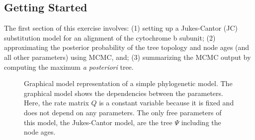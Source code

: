 \bigskip
\subsection{Getting Started}

The first section of this exercise involves:
(1) setting up a Jukes-Cantor (JC) substitution model for an alignment of the cytochrome b subunit;
(2) approximating the posterior probability of the tree topology and node ages (and all other parameters) using MCMC, and; 
(3) summarizing the MCMC output by computing the maximum \textit{a posteriori} tree. 

\begin{figure}[h!]
\centering
{}
\caption{\small Graphical model representation of a simple phylogenetic model. 
The graphical model shows the dependencies between the parameters.
Here, the rate matrix $Q$ is a constant variable because it is fixed and does not depend on any parameters.
The only free parameters of this model, the Jukes-Cantor model, are the tree $\Psi$ including the node ages.}
\label{fig:jc}
\end{figure}

